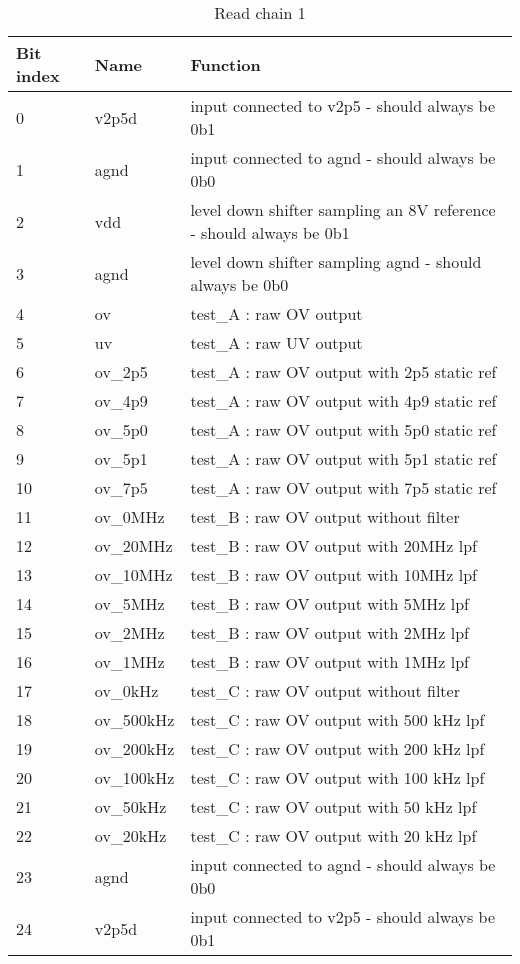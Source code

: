 \begin{table}[!htbp]
  \centering
  \begin{tabular}{@{}lll@{}}
    \toprule
    Bit index	& Name    & Function                                          \\ \toprule
    0	        & v2p5d	  & input connected to v2p5 - should always be 0b1 \\
    1         &	agnd    &	input connected to agnd - should always be 0b0 \\
    2         &	vdd     &	level down shifter sampling an 8V reference - should always be 0b1 \\
    3         &	agnd    &	level down shifter sampling agnd - should always be 0b0 \\
    4         &	ov      &	test\_A : raw OV output \\
    5         &	uv      &	test\_A : raw UV output \\
    6         &	ov\_2p5  & test\_A : raw OV output with 2p5 static ref \\
    7         &	ov\_4p9  &	test\_A : raw OV output with 4p9 static ref \\
    8         &	ov\_5p0	& test\_A : raw OV output with 5p0 static ref \\
    9         &	ov\_5p1  &	test\_A : raw OV output with 5p1 static ref \\
    10        &	ov\_7p5  &	test\_A : raw OV output with 7p5 static ref \\
    11        &	ov\_0MHz	& test\_B : raw OV output without filter \\
    12        &	ov\_20MHz&	test\_B : raw OV output with 20MHz lpf \\
    13        &	ov\_10MHz&	test\_B : raw OV output with 10MHz lpf \\
    14	      & ov\_5MHz &	test\_B : raw OV output with 5MHz lpf \\
    15        &	ov\_2MHz	& test\_B : raw OV output with 2MHz lpf \\
    16        &	ov\_1MHz	& test\_B : raw OV output with 1MHz lpf \\
    17        &	ov\_0kHz	& test\_C : raw OV output without filter \\
    18        &	ov\_500kHz	& test\_C : raw OV output with 500 kHz lpf \\
    19        &	ov\_200kHz	& test\_C : raw OV output with 200 kHz lpf \\
    20	      & ov\_100kHz	& test\_C : raw OV output with 100 kHz lpf \\
    21	      & ov\_50kHz	& test\_C : raw OV output with 50 kHz lpf \\
    22        &	ov\_20kHz	& test\_C : raw OV output with 20 kHz lpf \\
    23	      & agnd	    & input connected to agnd - should always be 0b0 \\
    24	      & v2p5d	    & input connected to v2p5 - should always be 0b1 \\
    \bottomrule
  \end{tabular}
  \caption{Read chain 1}
  \label{tab:read-chain-1}
\end{table}

